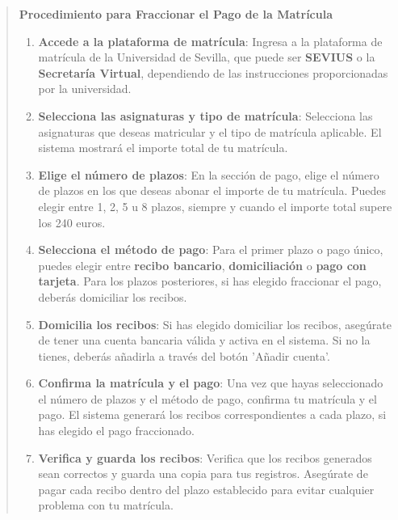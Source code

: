\documentclass[12pt,a4paper,oneside]{report}
\begin{document}
\begin{itemize}
\begin{itemize}
\begin{quote}
\noindent\textbf{Procedimiento para Fraccionar el Pago de la Matrícula}\\
\begin{enumerate}
  \item \textbf{Accede a la plataforma de matrícula}: Ingresa a la plataforma de matrícula de la Universidad de Sevilla, que puede ser \textbf{SEVIUS} o la \textbf{Secretaría Virtual}, dependiendo de las instrucciones proporcionadas por la universidad.
  \item \textbf{Selecciona las asignaturas y tipo de matrícula}: Selecciona las asignaturas que deseas matricular y el tipo de matrícula aplicable. El sistema mostrará el importe total de tu matrícula.
  \item \textbf{Elige el número de plazos}: En la sección de pago, elige el número de plazos en los que deseas abonar el importe de tu matrícula. Puedes elegir entre 1, 2, 5 u 8 plazos, siempre y cuando el importe total supere los 240 euros.
  \item \textbf{Selecciona el método de pago}: Para el primer plazo o pago único, puedes elegir entre \textbf{recibo bancario}, \textbf{domiciliación} o \textbf{pago con tarjeta}. Para los plazos posteriores, si has elegido fraccionar el pago, deberás domiciliar los recibos.
  \item \textbf{Domicilia los recibos}: Si has elegido domiciliar los recibos, asegúrate de tener una cuenta bancaria válida y activa en el sistema. Si no la tienes, deberás añadirla a través del botón 'Añadir cuenta'.
  \item \textbf{Confirma la matrícula y el pago}: Una vez que hayas seleccionado el número de plazos y el método de pago, confirma tu matrícula y el pago. El sistema generará los recibos correspondientes a cada plazo, si has elegido el pago fraccionado.
  \item \textbf{Verifica y guarda los recibos}: Verifica que los recibos generados sean correctos y guarda una copia para tus registros. Asegúrate de pagar cada recibo dentro del plazo establecido para evitar cualquier problema con tu matrícula.
\end{enumerate}



\end{quote}
\end{itemize}
\end{itemize}
\end{document}
